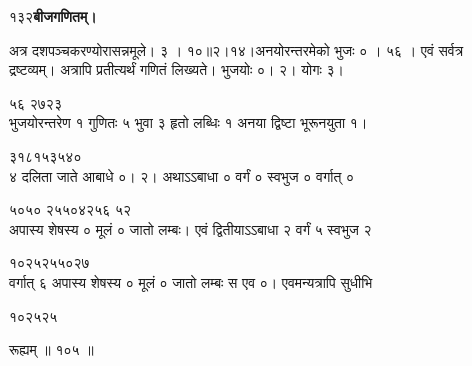 \documentclass[11pt, openany]{book}
\begin{document}
\onehalfspacing
 १३२\hspace{2in}\textbf{बीजगणितम्।} 

\vspace{5mm}

\begin{sloppypar}
\hangindent=0.2in \hspace{0.2in}अत्र दशपञ्चकरण्योरासन्नमूले। ३ । १०॥२।१४।अनयोरन्तरमेको भुजः ० । ५६ । एवं सर्वत्र द्रष्टव्यम्। अत्रापि प्रतीत्यर्थं गणितं लिख्यते। भुजयोः ०। २। योगः ३।

\hspace{3.2in}५६ २७\hspace{0.4in}२३\\

\hangindent=0.2in भुजयोरन्तरेण १ गुणितः ५ भुवा ३ हृतो लब्धिः १ अनया द्विष्टा भूरूनयुता १।

\hspace{0.9in}३१\hspace{0.5in}८\hspace{0.3in}१५\hspace{0.75in}३५\hspace{1.5in}४०\\

\hangindent=0.2in ४ दलिता जाते आबाधे ०। २। अथाऽऽबाधा ० वर्गं ० स्वभुज ० वर्गात् ० 

५०\hspace{1.25in}५० २५\hspace{0.8in}५०\hspace{0.25in}४२\hspace{0.45in}५६\hspace{0.3in} ५२\\

\hangindent=0.2in अपास्य शेषस्य ० मूलं ० जातो लम्बः। एवं द्वितीयाऽऽबाधा २ वर्गं ५ स्वभुज २

\hspace{0.9in}१०\hspace{0.25in}२५\hspace{2.15in}२५\hspace{0.2in}५०\hspace{0.4in}२७\\

\hangindent=0.2in वर्गात् ६ अपास्य शेषस्य ० मूलं ० जातो लम्बः स एव ०। एवमन्यत्रापि सुधीभि

\hspace{1.5in}१०\hspace{0.2in}२५\hspace{1.25in}२५

रूह्यम् ॥ १०५ ॥


\end{sloppypar}
\end{document}
